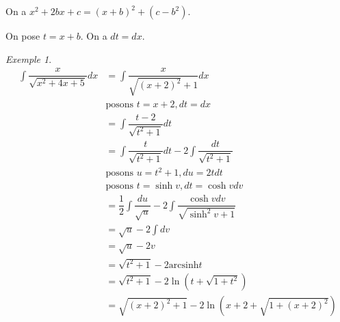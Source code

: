 \documentclass{report}
\theoremstyle{definition}
\theoremstyle{remark}
\newtheorem*{exem}{Exemple}
\begin{document}
\begin{enumerate}
		On a $x^2+2bx+c = (x+b)^2+(c-b^2)$.

		On pose $t = x+b$. On a $dt = dx$.
		\begin{exem}
			\begin{align*}
				\int \dfrac{x}{\sqrt{x^2+4x+5}} dx &= \int \dfrac{x}{\sqrt{(x+2)^2}+1} dx\\
				&\text{posons }t=x+2, dt=dx\\
				&= \int \dfrac{t-2}{\sqrt{t^2+1}} dt\\
				&= \int \dfrac{t}{\sqrt{t^2+1}} dt - 2\int \dfrac{dt}{\sqrt{t^2+1}}\\
				&\text{posons }u=t^2+1, du=2tdt\\
				&\text{posons }t=\sinh v, dt = \cosh v dv\\
				&= \dfrac{1}{2}\int \dfrac{du}{\sqrt{u}} - 2\int \dfrac{\cosh v dv}{\sqrt{\sinh^2v+1}}\\
				&= \sqrt{u} - 2\int dv\\
				&= \sqrt{u} - 2v\\
				&= \sqrt{t^2+1} - 2 \mathrm{arcsinh}t\\
				&= \sqrt{t^2+1} - 2\ln(t+\sqrt{1+t^2})\\
				&= \sqrt{(x+2)^2+1} - 2\ln\left( x+2+\sqrt{1+(x+2)^2} \right)
			\end{align*}
		\end{exem}
	\end{enumerate}
\end{document}
